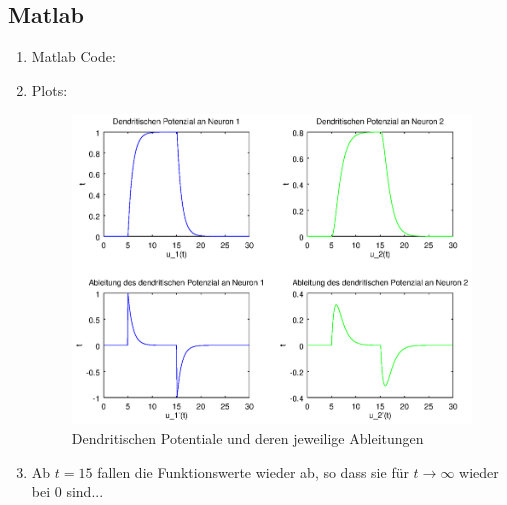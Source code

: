 \documentclass[DIN, pagenumber=false, fontsize=11pt, parskip=half]{scrartcl}
\begin{document}
    \subsection{Matlab}
    \begin{enumerate}[label=(\alph*)]
        \item Matlab Code:
            
        
        \item Plots:
            \begin{figure}[H]
                \centering
                \includegraphics[trim = {0 9cm 27cm 0}, clip,width=\textwidth]{Plot}
                \caption{Dendritischen Potentiale und deren jeweilige Ableitungen}
            \end{figure} 

        \item Ab $t=15$ fallen die Funktionswerte wieder ab, so dass sie für $t \to \infty$ wieder bei $0$ sind...%
    \end{enumerate}
\end{document}

